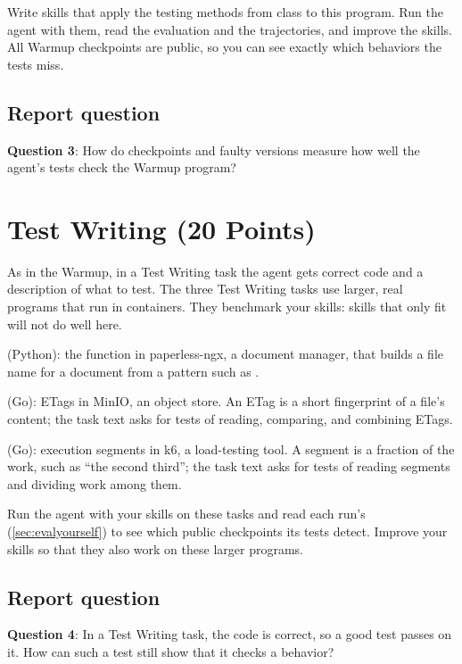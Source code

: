 \documentclass[letterpaper,11pt]{article}
\begin{document}
Write skills that apply the testing methods from class to this program. Run the
agent with them, read the evaluation and the trajectories, and improve the
skills. All Warmup checkpoints are public, so you can see exactly which
behaviors the tests miss.

\subsection{Report question}

\textbf{Question 3}: How do checkpoints and faulty versions measure how well
the agent's tests check the Warmup program?

\section{Test Writing (20 Points)}

As in the Warmup, in a Test Writing task the agent gets correct code and a
description of what to test. The three Test Writing tasks use larger, real
programs that run in containers. They benchmark your skills: skills that only
fit  will not do well here.

\squishlist
 \item {} (Python): the function in paperless-ngx, a document
   manager, that builds a file name for a document from a pattern such as
   .
 \item {} (Go): ETags in MinIO, an object store. An ETag is a short
   fingerprint of a file's content; the task text asks for tests of reading,
   comparing, and combining ETags.
 \item {} (Go): execution segments in k6, a load-testing tool. A segment
   is a fraction of the work, such as ``the second third''; the task text asks
   for tests of reading segments and dividing work among them.
\squishend

Run the agent with your skills on these tasks and read each run's
 (\autoref{sec:evalyourself}) to see which public checkpoints its
tests detect. Improve your skills so that
they also work on these larger programs.

\subsection{Report question}

\textbf{Question 4}: In a Test Writing task, the code is correct, so a good
test passes on it. How can such a test still show that it checks a behavior?
\end{document}
